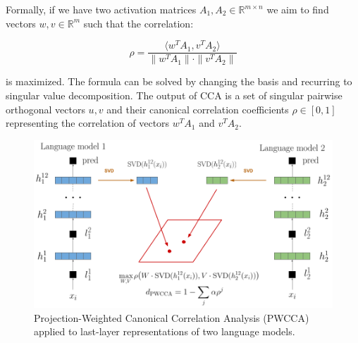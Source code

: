 \documentclass[a4paper, nobind]{templates/ociamthesis}
\begin{document}
Formally, if we have two activation matrices \(A_1, A_2 \in \mathbb{R}^{m \times n}\) we aim to find vectors \(w, v \in \mathbb{R}^m\) such that the correlation:

\begin{equation}
\rho = \frac{\langle w^TA_1, v^TA_2 \rangle}{\|w^TA_1\| \cdot \| v^T A_2\|}
\end{equation}

is maximized. The formula can be solved by changing the basis and recurring to singular value decomposition. The output of CCA is a set of singular pairwise orthogonal vectors \(u, v\) and their canonical correlation coefficients \(\rho \in [0,1]\) representing the correlation of vectors \(w^TA_1\) and \(v^TA_2\).



\begin{figure}

{\centering \includegraphics[width=0.85\linewidth]{figures/2_pwcca} 

}

\caption{Projection-Weighted Canonical Correlation Analysis (PWCCA) applied to last-layer representations of two language models.}\label{fig:pwcca}
\end{figure}
\end{document}
